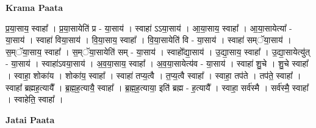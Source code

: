 \documentclass[17pt]{extarticle}
\begin{document}
\textbf{Krama Paata} \newline

प्र॒या॒साय॒ स्वाहा᳚ । प्र॒या॒सायेति॑ प्र - या॒साय॑ । स्वाहा॑ ऽऽया॒साय॑ । आ॒या॒साय॒ स्वाहा᳚ । आ॒या॒सायेत्या᳚ - या॒साय॑ । स्वाहा॑ विया॒साय॑ । वि॒या॒साय॒ स्वाहा᳚ । वि॒या॒सायेति॑ वि - या॒साय॑ । स्वाहा॑ सम्ॅया॒साय॑ । स॒म्ॅया॒साय॒ स्वाहा᳚ । स॒म्ॅया॒सायेति॑ सम् - या॒साय॑ । स्वाहो᳚द्या॒साय॑ । उ॒द्या॒साय॒ स्वाहा᳚ । उ॒द्या॒सायेत्यु॑त् - या॒साय॑ । स्वाहा॑ऽवया॒साय॑ । अ॒व॒या॒साय॒ स्वाहा᳚ । अ॒व॒या॒सायेत्य॑व - या॒साय॑ । स्वाहा॑ शु॒चे । शु॒चे स्वाहा᳚ । स्वाहा॒ शोका॑य । शोका॑य॒ स्वाहा᳚ । स्वाहा॑ तप्य॒त्वै । त॒प्य॒त्वै स्वाहा᳚ । स्वाहा॒ तप॑ते । तप॑ते॒ स्वाहा᳚ । स्वाहा᳚ ब्रह्मह॒त्यायै᳚ । ब्र॒ह्म॒ह॒त्यायै॒ स्वाहा᳚ । ब्र॒ह्म॒ह॒त्याया॒ इति॑ ब्रह्म - ह॒त्यायै᳚ । स्वाहा॒ सर्व॑स्मै । सर्व॑स्मै॒ स्वाहा᳚ । स्वाहेति॒ स्वाहा᳚ । \newline

\textbf{Jatai Paata} \newline
\end{document}
